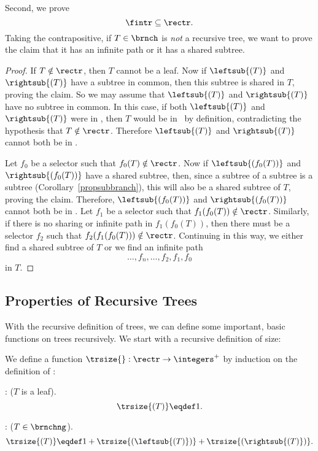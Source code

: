 \begin{definition}
Second, we prove
\begin{equation}\label{fintrsubrectr}
\fintr \subseteq \rectr.
\end{equation}
Taking the contrapositive, if $T \in \brnch$ is \emph{not} a recursive
tree, we want to prove the claim that it has an infinite path or it
has a shared subtree.

\begin{proof}
If $T \notin \rectr$, then $T$ cannot be a leaf.  Now if
$\leftsub{(T)}$ and $\rightsub{(T)}$ have a subtree in common, then
this subtree is shared in $T$, proving the claim.  So we may assume
that $\leftsub{(T)}$ and $\rightsub{(T)}$ have no subtree in common.
In this case, if both $\leftsub{(T)}$ and $\rightsub{(T)}$ were in
\rectr, then $T$ would be in \rectr\ by definition, contradicting the
hypothesis that $T \notin \rectr$.  Therefore $\leftsub{(T)}$ and
$\rightsub{(T)}$ cannot both be in \rectr.

Let $f_0$ be a selector such that $f_0(T) \notin \rectr$.  Now if
$\leftsub{(f_0(T))}$ and $\rightsub{(f_0(T))}$ have a shared subtree,
then, since a subtree of a subtree is a subtree
(Corollary~\ref{propsubbranch}), this will also be a shared subtree of
$T$, proving the claim.  Therefore, $\leftsub{(f_0(T))}$ and
$\rightsub{(f_0(T))}$ cannot both be in \rectr.  Let $f_1$ be a
selector such that $f_1(f_0(T)) \notin \rectr$.  Similarly, if there
is no sharing or infinite path in $f_1(f_0(T))$, then there must be a
selector $f_2$ such that $f_2(f_1(f_0(T))) \notin \rectr$.  Continuing
in this way, we either find a shared subtree of $T$ or we find an
infinite path
\[
\dots,f_n,\dots, f_2,f_1,f_0
\]
in $T$.
\end{proof}

\subsection{Properties of Recursive Trees}
With the recursive definition of trees, we can define some important,
basic functions on trees recursively.  We start with a recursive
definition of size:
\begin{definition}
We define a function $\trsize{}: \rectr \to \integers^+$ by induction on
the definition of \rectr:

: ($T$ is a leaf).
\[
\trsize{(T)} \eqdef 1.
\]

: ($T \in \brnchng$).
\[
\trsize{(T)} \eqdef 1 + \trsize{(\leftsub{(T)})} + \trsize{(\rightsub{(T)})}.
\]
\end{definition}


\end{definition}
